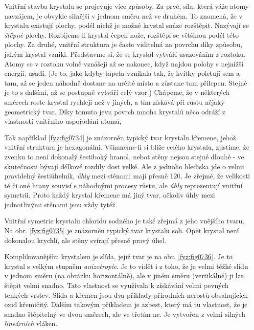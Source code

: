     Vnitřní stavba krystalu se projevuje více způsoby. Za prvé, síla, která váže atomy navzájem, je 
    obvykle silnější v jednom směru než ve druhém. To znamená, že v krystalu existují plochy, podél 
    nichž je možné krystal snáze rozštěpit. Nazývají se \emph{štěpné} plochy. Rozbijeme-li krystal 
    čepelí nože, rozštěpí se většinou podél této plochy. Za druhé, vnitřní struktura je často 
    viditelná na povrchu díky způsobu, jakým krystal vznikl. Představme si, že se krystal vytváří 
    usazováním z roztoku. Atomy se v roztoku volně vznášejí až se nakonec, když najdou polohy s 
    nejnižší energií, usadí. (Je to, jako kdyby tapeta vznikala tak, že kvítky poletují sem a tam, 
    až se jeden náhodně dostane na určité místo a zůstane tam přilepen. Stejně je to s dalšími, až 
    se postupně vytváří celý vzor.) Chápeme, že v některých směrech roste krystal rychleji než v 
    jiných, a tím získává při růstu nějaký geometrický tvar. Díky tomuto jevu povrch mnoha krystalů 
    něco odráží z vlastností vnitřního uspořádání atomů,
    
    Tak například \ref{fyz:fig0734} je znázorněn typický tvar krystalu křemene, jehož vnitřní 
    struktura je hexagonální. Všimneme-li si blíže celého krystalu, zjistíme, že zvenku to není 
    dokonalý šestiboký hranol, neboť stěny nejsou stejné dlouhé - ve skutečnosti bývají délkové 
    rozdíly dost velké. Ale z jednoho hlediska jde o velmi pravidelný šestiúhelník, \emph{úhly} 
    mezi stěnami mají přesně \SI{120}{\deg}. Je zřejmé, že velikosti té či oné hrany souvisí s 
    náhodnými procesy růstu, ale \emph{úhly} reprezentují vnitřní symetrii. Proto každý krystal 
    křemene má jiný tvar, ačkoliv úhly mezi jednotlivými stěnami jsou vždy tytéž. 
    
    Vnitřní symetrie krystalu chloridu sodného je také zřejmá z jeho vnějšího tvaru. Na obr. 
    \ref{fyz:fig0735} je znázorněn typický tvar krystalu soli. Opět krystal není dokonalou krychlí, 
    ale stěny svírají přesně pravý úhel. 
    
    Komplikovanějším krystalem je slída, jejíž tvar je na obr. \ref{fyz:fig0736}. Je to krystal s 
    velkým stupněm \emph{anizotropie}. Je to vidět i z toho, že je velmi těžké slídu v jednom směru 
    (na obrázku horizontálně), ale v jiném směru (vertikálně) ji lze štěpit velmi snadno. Tato 
    vlastnost se využívala k získávání velmi pevných tenkých vrstev. Slída a křemen jsou dva 
    příklady přírodních nerostů obsahujících oxid křemičitý. Dalším takovým příkladem je azbest, 
    který má tu vlastnost, že je snadno štěpitelný ve dvou směrech, ale ve třetím ne. Je vytvořen z 
    velmi silných \emph{lineárních} vláken. 
    
